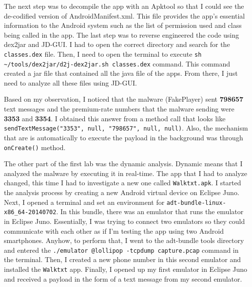 \documentclass[letterpaper,10pt,titlepage,draftclsnofoot,onecolumn]{IEEEtran}
\begin{document}
The next step was to decompile the app with an Apktool so that I could see the de-codified version of AndroidManifest.xml.
This file provides the app's essential information to the Android system such as the list of permission used and class being called in the app.
The last step was to reverse engineered the code using dex2jar and JD-GUI.
I had to open the correct directory and search for the \verb|classes.dex| file.
Then, I need to open the terminal to execute \verb|sh ~/tools/dex2jar/d2j-dex2jar.sh classes.dex| command.
This command created a jar file that contained all the java file of the apps.
From there, I just need to analyze all these files using JD-GUI.

Based on my observation, I noticed that the malware (FakePlayer) sent \textbf{798657} text messages and the premium-rate numbers that the malware sending were \textbf{3353} and \textbf{3354}.
I obtained this answer from a method call that looks like \verb|sendTextMessage("3353", null, "798657", null, null)|.
Also, the mechanism that are is automatically to execute the payload in the background was through \verb|onCreate()| method.

The other part of the first lab was the dynamic analysis.
Dynamic means that I analyzed the malware by executing it in real-time.
The app that I had to analyze changed, this time I had to investigate a new one called \verb|Walktxt.apk|.
I started the analysis process by creating a new Android virtual device on Eclipse Juno.
Next, I opened a terminal and set an environment for \verb|adt-bundle-linux-x86_64-20140702|.
In this bundle, there was an emulator that runs the emulator in Eclipse Juno.
Essentially, I was trying to connect two emulators so they could communicate with each other as if I'm testing the app using two Android smartphones.
Anyhow, to perform that, I went to the adt-bundle tools directory and entered the \verb|./emulator @lollipop -tcpdump capture.pcap| command in the terminal.
Then, I created a new phone number in this second emulator and installed the \verb|Walktxt| app. 
Finally, I opened up my first emulator in Eclipse Juno and received a payload in the form of a text message from my second emulator.

\hfill\\
\end{document}
